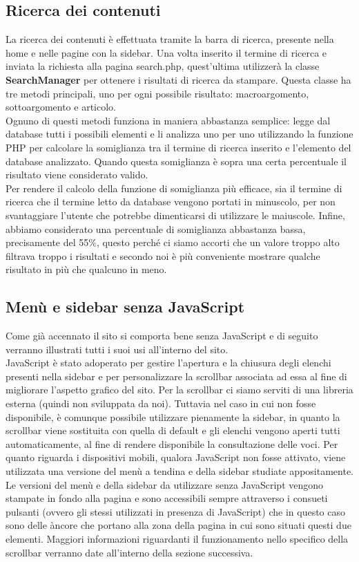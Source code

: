 \documentclass[12pt]{article}
\begin{document}
	
	\subsection{Ricerca dei contenuti}
	La ricerca dei contenuti è effettuata tramite la barra di ricerca, presente nella home e nelle pagine con la sidebar. Una volta inserito il termine di ricerca e inviata la richiesta alla pagina search.php, quest'ultima utilizzerà la classe \textbf{SearchManager} per ottenere i risultati di ricerca da stampare. Questa classe ha tre metodi principali, uno per ogni possibile risultato: macroargomento, sottoargomento e articolo. \\
Ognuno di questi metodi funziona in maniera abbastanza semplice: legge dal database tutti i possibili elementi e li analizza uno per uno utilizzando la funzione PHP  per calcolare la somiglianza tra il termine di ricerca inserito e l'elemento del database analizzato. Quando questa somiglianza è sopra una certa percentuale il risultato viene considerato valido. \\
Per rendere il calcolo della funzione di somiglianza più efficace, sia il termine di ricerca che il termine letto da database vengono portati in minuscolo, per non svantaggiare l'utente che potrebbe dimenticarsi di utilizzare le maiuscole. Infine, abbiamo considerato una percentuale di somiglianza abbastanza bassa, precisamente del 55\%, questo perché ci siamo accorti che un valore troppo alto filtrava troppo i risultati e secondo noi è più conveniente mostrare qualche risultato in più che qualcuno in meno.
	
	\subsection{Menù e sidebar senza JavaScript}
		Come già accennato il sito si comporta bene senza JavaScript e di seguito verranno illustrati tutti i suoi usi all'interno del sito. \\
		JavaScript è stato adoperato per gestire l'apertura e la chiusura degli elenchi presenti nella sidebar e per  personalizzare la scrollbar associata ad essa al fine di migliorare l'aspetto grafico del sito. Per la scrollbar ci siamo serviti di una libreria esterna (quindi non sviluppata da noi). Tuttavia nel caso in cui non fosse disponibile, è comunque possibile utilizzare pienamente la sidebar, in quanto la scrollbar viene sostituita con quella di default e gli elenchi vengono aperti tutti automaticamente, al fine di rendere disponibile la consultazione delle voci. Per quanto riguarda i dispositivi mobili, qualora JavaScript non fosse attivato, viene utilizzata una versione del menù a tendina e della sidebar studiate appositamente. Le versioni del menù e della sidebar da utilizzare senza JavaScript vengono stampate in fondo alla pagina e sono accessibili sempre attraverso i consueti pulsanti (ovvero gli stessi utilizzati in presenza di JavaScript) che in questo caso sono delle àncore che portano alla zona della pagina in cui sono situati questi due elementi.
		Maggiori informazioni riguardanti il funzionamento nello specifico della scrollbar verranno date all'interno della sezione successiva.
\end{document}
